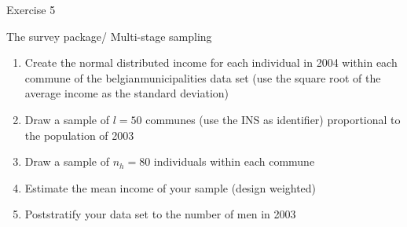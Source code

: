 \documentclass[11pt,german,hideothersubsections]{beamer}
\begin{document}
\begin{frame}[fragile]{Exercise 5}
\footnotesize{
\begin{exampleblock}{The survey package/ Multi-stage sampling}
\begin{enumerate}
\item Create the normal distributed income for each individual in 2004 within each commune of the belgianmunicipalities data set (use the square root of the average income as the standard deviation)
\item Draw a sample of $l=50$ communes (use the INS as identifier) proportional to the population of 2003
\item Draw a sample of $n_h=80$ individuals within each commune
\item Estimate the mean income of your sample (design weighted)
\item Poststratify your data set to the number of men in 2003
\end{enumerate}
\end{exampleblock}
}
\end{frame}

\end{document}
